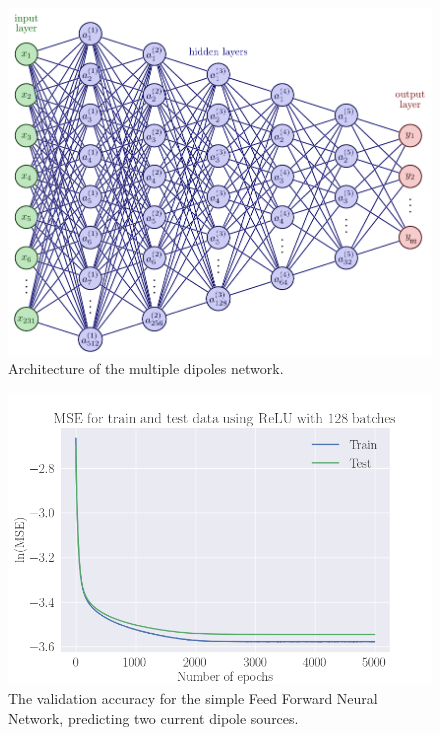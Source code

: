 \documentclass[a4paper, UKenglish, 11pt]{uiomaster}
\begin{document}
\begin{figure}[!htb]
  \centering
  \includegraphics[width=\linewidth]{figures/NN_multiple_outputs.pdf}
  \caption{Architecture of the multiple dipoles network.}
  \label{fig:NN_multiple_dipoles_architecture}
\end{figure}



\begin{figure}[!htb]
    \centering
    \includegraphics[width=\linewidth]{figures/MSE_26june_two_dipoles_w_amplitude_5000_SGD_lr0.001_wd0.1_mom0.35_bs128_10noise_ReLU_128_5000_N_dipoles_2.png}
    \caption{The validation accuracy for the simple Feed Forward Neural Network, predicting two current dipole sources.}
    \label{fig:dipole_area_result}
\end{figure}
\end{document}
